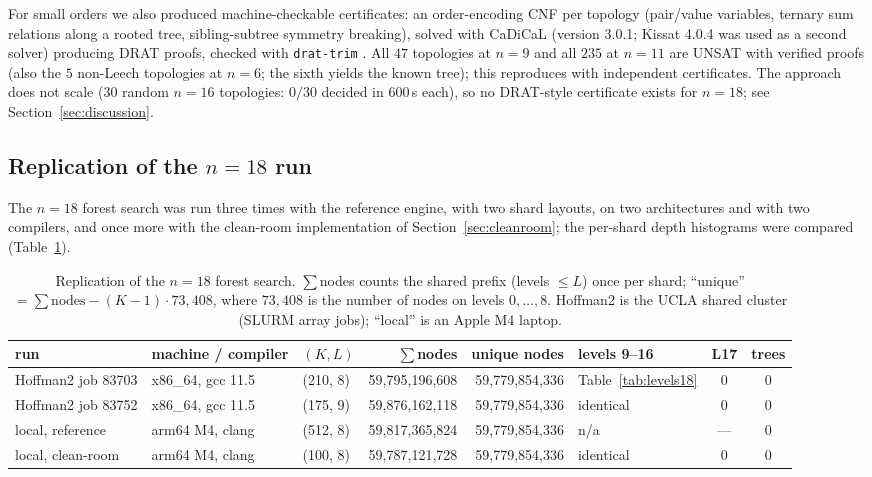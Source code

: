 \documentclass[11pt,a4paper]{article}
\theoremstyle{plain}
\theoremstyle{remark}
\begin{document}
For small orders we also produced machine-checkable certificates: an
order-encoding CNF per topology (pair/value variables, ternary sum relations
along a rooted tree, sibling-subtree symmetry breaking), solved with CaDiCaL
\cite{BiereCaDiCaL2020,BiereCaDiCaL2024} (version 3.0.1; Kissat 4.0.4 was used
as a second solver) producing DRAT proofs, checked with \texttt{drat-trim}
\cite{WetzlerHeuleHunt2014}.  All $47$ topologies at $n=9$ and all $235$ at
$n=11$ are UNSAT with verified proofs (also the $5$ non-Leech topologies at
$n=6$; the sixth yields the known tree); this reproduces
\cite{SzekelyWangZhang2005} with independent certificates.  The approach does
not scale ($30$ random $n=16$ topologies: $0/30$ decided in $600$\,s each), so
no DRAT-style certificate exists for $n=18$; see Section~\ref{sec:discussion}.

\subsection{Replication of the \texorpdfstring{$n=18$}{n = 18} run}\label{sec:replication}

The $n=18$ forest search was run three times with the reference engine, with
two shard layouts, on two architectures and with two compilers, and once more
with the clean-room implementation of Section~\ref{sec:cleanroom}; the
per-shard depth histograms were compared (Table~\ref{tab:replication}).

\begin{table}[ht]
\centering
\caption{Replication of the $n=18$ forest search.  $\sum$nodes counts the shared
prefix (levels $\le L$) once per shard; ``unique'' $=\sum\text{nodes}-(K-1)\cdot
73{,}408$, where $73{,}408$ is the number of nodes on levels $0,\dots,8$.
Hoffman2 is the UCLA shared cluster (SLURM array jobs); ``local'' is an Apple
M4 laptop.}
\label{tab:replication}
\footnotesize
\setlength{\tabcolsep}{3.5pt}
\begin{tabular}{@{}lllrrlcc@{}}
\toprule
run & machine / compiler & $(K,L)$ & $\sum$nodes & unique nodes & levels 9--16 & L17 & trees\\
\midrule
Hoffman2 job 83703 & x86\_64, gcc 11.5 & (210, 8) & 59,795,196,608 & 59,779,854,336 & Table~\ref{tab:levels18} & 0 & 0\\
Hoffman2 job 83752 & x86\_64, gcc 11.5 & (175, 9) & 59,876,162,118 & 59,779,854,336 & identical & 0 & 0\\
local, reference & arm64 M4, clang & (512, 8) & 59,817,365,824 & 59,779,854,336 & n/a\footnotemark & --- & 0\\
local, clean-room & arm64 M4, clang & (100, 8) & 59,787,121,728 & 59,779,854,336 & identical & 0 & 0\\
\bottomrule
\end{tabular}
\end{table}
\end{document}
